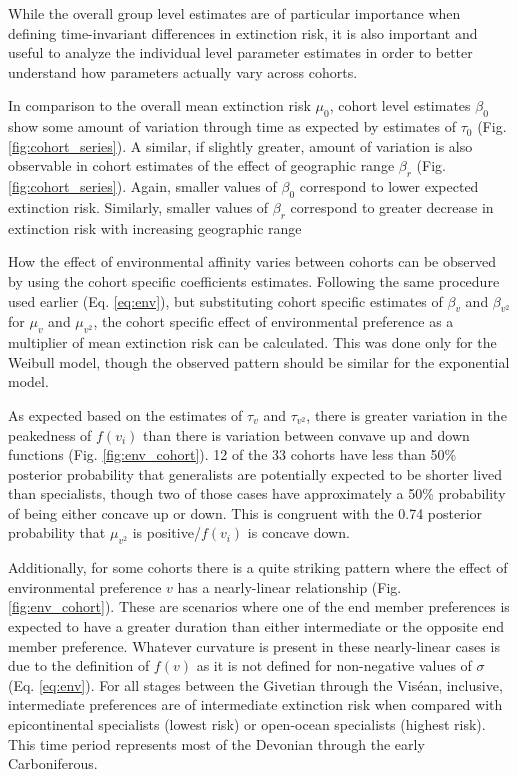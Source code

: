 \documentclass{article}
\begin{document}
While the overall group level estimates are of particular importance when defining time-invariant differences in extinction risk, it is also important and useful to analyze the individual level parameter estimates in order to better understand how parameters actually vary across cohorts.

In comparison to the overall mean extinction risk \(\mu_{0}\), cohort level estimates \(\beta_{0}\) show some amount of variation through time as expected by estimates of \(\tau_{0}\) (Fig. \ref{fig:cohort_series}). A similar, if slightly greater, amount of variation is also observable in cohort estimates of the effect of geographic range \(\beta_{r}\) (Fig. \ref{fig:cohort_series}). Again, smaller values of \(\beta_{0}\) correspond to lower expected extinction risk. Similarly, smaller values of \(\beta_{r}\) correspond to greater decrease in extinction risk with increasing geographic range 

How the effect of environmental affinity varies between cohorts can be observed by using the cohort specific coefficients estimates. Following the same procedure used earlier (Eq. \ref{eq:env}), but substituting cohort specific estimates of \(\beta_{v}\) and \(\beta_{v^{2}}\) for \(\mu_{v}\) and \(\mu_{v^{2}}\), the cohort specific effect of environmental preference as a multiplier of mean extinction risk can be calculated. This was done only for the Weibull model, though the observed pattern should be similar for the exponential model. 

As expected based on the estimates of \(\tau_{v}\) and \(\tau_{v^{2}}\), there is greater variation in the peakedness of \(f(v_{i})\) than there is variation between convave up and down functions (Fig. \ref{fig:env_cohort}). 12 of the 33 cohorts have less than 50\% posterior probability that generalists are potentially expected to be shorter lived than specialists, though two of those cases have approximately a 50\% probability of being either concave up or down. This is congruent with the 0.74 posterior probability that \(\mu_{v^{2}}\) is positive/\(f(v_{i})\) is concave down.

Additionally, for some cohorts there is a quite striking pattern where the effect of environmental preference \(v\) has a nearly-linear relationship (Fig. \ref{fig:env_cohort}). These are scenarios where one of the end member preferences is expected to have a greater duration than either intermediate or the opposite end member preference. Whatever curvature is present in these nearly-linear cases is due to the definition of \(f(v)\) as it is not defined for non-negative values of \(\sigma\) (Eq. \ref{eq:env}). For all stages between the Givetian through the Vis\'{e}an, inclusive, intermediate preferences are of intermediate extinction risk when compared with epicontinental specialists (lowest risk) or open-ocean specialists (highest risk). This time period represents most of the Devonian through the early Carboniferous.
\end{document}

